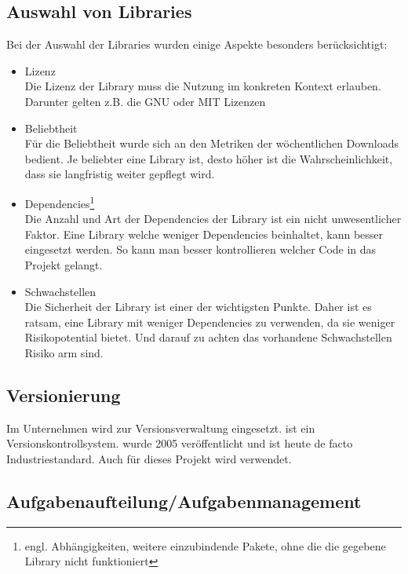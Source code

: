 \subsection{Auswahl von Libraries}
\label{sec:Durchführungsphase:AuswahlVonLibraries}

Bei der Auswahl der Libraries wurden einige Aspekte besonders berücksichtigt:

\begin{itemize}
    \item Lizenz\\
    Die Lizenz der Library muss die Nutzung im konkreten Kontext erlauben. Darunter gelten z.B. die GNU oder MIT Lizenzen
    \item Beliebtheit\\
    Für die Beliebtheit wurde sich an den Metriken der wöchentlichen Downloads bedient. Je beliebter eine Library ist, desto höher ist die Wahrscheinlichkeit, dass sie langfristig weiter gepflegt wird.
    \item Dependencies\footnote{engl. Abhängigkeiten, weitere einzubindende Pakete, ohne die die gegebene Library nicht funktioniert}\\
	Die Anzahl und Art der Dependencies der Library ist ein nicht unwesentlicher Faktor. Eine Library welche weniger Dependencies beinhaltet, kann besser eingesetzt werden. So kann man besser kontrollieren welcher Code in das Projekt gelangt.
	\item Schwachstellen\\
	Die Sicherheit der Library ist einer der wichtigsten Punkte. Daher ist es ratsam, eine Library mit weniger Dependencies zu verwenden, da sie weniger Risikopotential bietet. Und darauf zu achten das vorhandene Schwachstellen Risiko arm sind.
\end{itemize}

\subsection{Versionierung}

Im Unternehmen wird  zur Versionsverwaltung eingesetzt.  ist ein Versionskontrollsystem.  wurde 2005 veröffentlicht und ist heute de facto Industriestandard. Auch für dieses Projekt wird  verwendet.

\subsection{Aufgabenaufteilung/Aufgabenmanagement}

